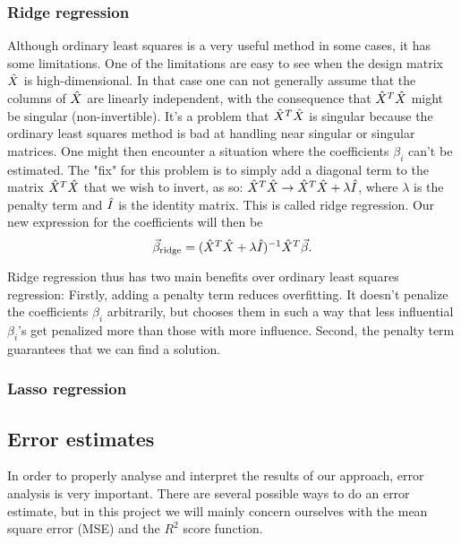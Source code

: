 \documentclass[a4paper,12pt]{article}
\begin{document}
\subsubsection{Ridge regression}
Although ordinary least squares is a very useful method in some cases, it has some limitations. One of the limitations are easy to see when the design matrix $\Hat{X}$ is high-dimensional. In that case one can not generally assume that the columns of $\Hat{X}$ are linearly independent, with the consequence that $\Hat{X}^T\Hat{X}$ might be singular (non-invertible). It's a problem that $\Hat{X}^T\Hat{X}$ is singular because the ordinary least squares method is bad at handling near singular or singular matrices. One might then encounter a situation where the coefficients $\beta_i$ can't be estimated.\newline
The "fix" for this problem is to simply add a diagonal term to the matrix $\Hat{X}^T\Hat{X}$ that we wish to invert, as so: $\Hat{X}^T\Hat{X} \rightarrow \Hat{X}^T\Hat{X} + \lambda \Hat{I}$, where $\lambda$ is the penalty term and $\Hat{I}$ is the identity matrix. This is called ridge regression. Our new expression for the coefficients will then be
\begin{equation}
\vec{\beta}_{\text{ridge}}=(\hat{X}^T\hat{X}+\lambda \Hat{I})^{-1}\hat{X}^T\vec{\beta}.
\end{equation}

Ridge regression thus has two main benefits over ordinary least squares regression: Firstly, adding a penalty term reduces overfitting. It doesn't penalize the coefficients $\beta_i$ arbitrarily, but chooses them in such a way that less influential $\beta_i$'s get penalized more than those with more influence.\newline  
Second, the penalty term guarantees that we can find a solution.


\subsubsection{Lasso regression}

\subsection{Error estimates}
In order to properly analyse and interpret the results of our approach, error analysis is very important. There are several possible ways to do an error estimate, but in this project we will mainly concern ourselves with the mean square error (MSE) and the $R^2$ score function.\newline
\end{document}

